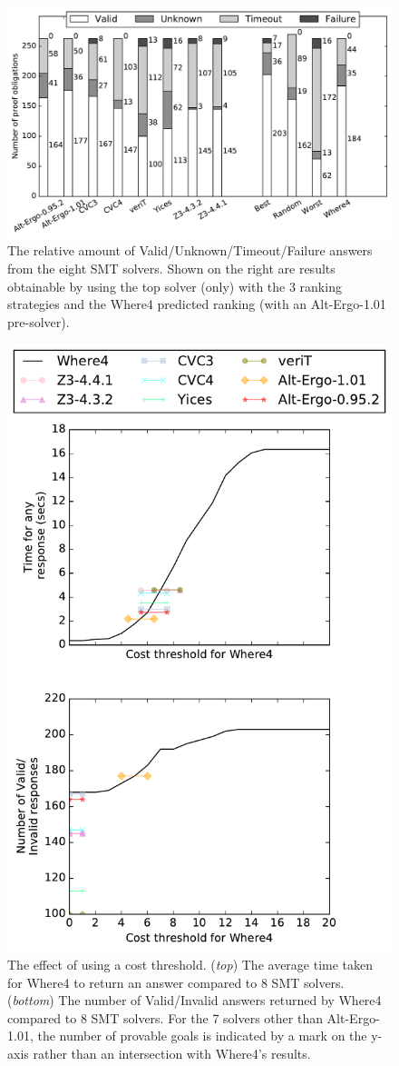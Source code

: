\documentclass[submission,copyright,creativecommons]{eptcs}
\begin{document}
\begin{figure}
	\centering
	\includegraphics[width=0.9\linewidth]{barcharts2}
	\caption{The relative amount of Valid/Unknown/Timeout/Failure answers from the eight SMT solvers. Shown on the right are results obtainable by using the top solver (only) with the 3 ranking strategies and the \textsf{Where4} predicted ranking (with an Alt-Ergo-1.01 pre-solver).}
	\label{fig:barchart2}
\end{figure}

\begin{figure}
	\centering
	\includegraphics[width=0.8\linewidth]{thresholds}
	\caption{The effect of using a cost threshold. (\textit{top}) The average time taken for \textsf{Where4} to return an answer compared to 8 SMT solvers. (\textit{bottom}) The number of Valid/Invalid answers returned by \textsf{Where4} compared to 8 SMT solvers. For the 7 solvers other than Alt-Ergo-1.01, the number of provable goals is indicated by a mark on the y-axis rather than an intersection with \textsf{Where4}'s results.}
	\label{fig:thresholds}
\end{figure}
\end{document}
